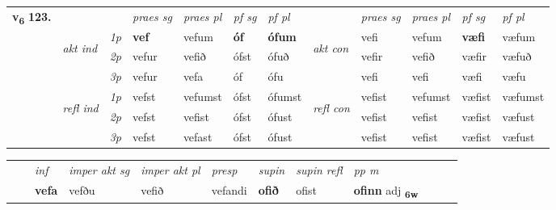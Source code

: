 \begin{tabular}{llllllllllll} \toprule
\multirow{4}{*}{{{\textbf{v{\textsubscript{6}}} \Large{\textbf{123.}}}}}  & &   &  \textit{praes sg}  & \textit{praes pl}  &\textit{ pf sg} & \textit{pf pl} &  &  \textit{praes sg}  & \textit{praes pl}  & \textit{pf sg} & \textit{pf pl } \\*
	\cmidrule{4-7} \cmidrule{9-12}
 & \multirow{3}{*}{\begin{turn}{90}\textit{akt ind}\end{turn}} & {\textit{1p}} & \textbf{vef} & vefum    & \textbf{óf} & \textbf{ófum} & \multirow{3}{*}{\begin{turn}{90}\textit{akt con}\end{turn}} &vefi & vefum & \textbf{væfi} & væfum\\*
& &  {\textit{2p}} &  vefur  & vefið   & ófst & ófuð & & vefir & vefið & væfir & væfuð \\*
& &  {\textit{3p}} & vefur & vefa   & óf & ófu & & vefi & vefi& væfi & væfu  \\*
\cmidrule{4-7} \cmidrule{9-12}
 &\multirow{3}{*}{\begin{turn}{90}\textit{refl ind}\end{turn}} & {\textit{1p}} & vefst & vefumst    & ófst & ófumst & \multirow{3}{*}{\begin{turn}{90}\textit{refl con}\end{turn}}  &vefist & vefumst & væfist & væfumst\\*
 &&  {\textit{2p}} &  vefst  & vefist   & ófst & ófust & &vefist & vefist & væfist & væfust \\*
& &  {\textit{3p}} & vefst & vefast   & ófst & ófust & & vefist & vefist& væfist & væfust  \\*
\cmidrule{4-7} \cmidrule{9-12}
\end{tabular}


\begin{tabular}{llllllllllll}
 & & \textit{inf} & \textit{imper akt sg} & \textit{imper akt pl}   & \textit{presp} & \textit{supin} & \textit{supin refl} & \textit{pp m}     \\*
  & & \textbf{vefa} & vefðu  & vefið   & vefandi &  \textbf{ofið} & ofist & \textbf{ofinn} adj \textbf{\textsubscript{6w}} \\*
\cmidrule{1-12}
\end{tabular}



